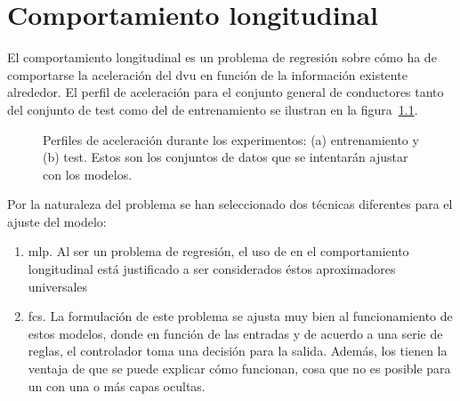 \chapter{Comportamiento longitudinal}
\label{ch:longitudinal-model}

El comportamiento longitudinal es un problema de regresión sobre cómo ha de comportarse la aceleración del \gls{dvu} en función de la información existente alrededor. El perfil de aceleración para el conjunto general de conductores tanto del conjunto de test como del de entrenamiento se ilustran en la figura~\ref{fig:acceleration-profiles}.

\begin{figure}[!b]
	\centering
	\qquad
	\caption[Perfiles de aceleración a ajustar por los modelos. Conjuntos de entrenamiento y de test]{Perfiles de aceleración durante los experimentos: (a) entrenamiento y (b) test. Estos son los conjuntos de datos que se intentarán ajustar con los modelos.}
	\label{fig:acceleration-profiles}
\end{figure}

Por la naturaleza del problema se han seleccionado dos técnicas diferentes para el ajuste del modelo:

\begin{enumerate}
	\item \Acrshort{mlp}. Al ser un problema de regresión, el uso de  en el comportamiento longitudinal está justificado a ser considerados éstos aproximadores universales~\cite{hornik1991approximation}
	\item \Acrshort{fcs}. La formulación de este problema se ajusta muy bien al funcionamiento de estos modelos, donde en función de las entradas y de acuerdo a una serie de reglas, el controlador toma una decisión para la salida. Además, los  tienen la ventaja de que se puede explicar cómo funcionan, cosa que no es posible para un  con una o más capas ocultas.
\end{enumerate}

